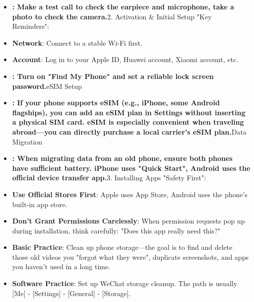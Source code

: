 

\begin{itemize}
  \item \textbf{: Make a test call to check the earpiece and microphone, take a photo to check the camera.}2. Activation \& Initial Setup "Key Reminders":
  \item \textbf{Network}: Connect to a stable Wi-Fi first.
  \item \textbf{Account}: Log in to your Apple ID, Huawei account, Xiaomi account, etc.
\end{itemize}


\begin{itemize}
  \item \textbf{: Turn on "Find My Phone" and set a reliable lock screen password.}eSIM Setup
  \item \textbf{: If your phone supports eSIM (e.g., iPhone, some Android flagships), you can add an eSIM plan in Settings without inserting a physical SIM card. eSIM is especially convenient when traveling abroad—you can directly purchase a local carrier's eSIM plan.}Data Migration
  \item \textbf{: When migrating data from an old phone, ensure both phones have sufficient battery. iPhone uses "Quick Start", Android uses the official device transfer app.}3. Installing Apps "Safety First":
  \item \textbf{Use Official Stores First}: Apple uses App Store, Android uses the phone's built-in app store.
  \item \textbf{Don't Grant Permissions Carelessly}: When permission requests pop up during installation, think carefully: "Does this app really need this?"
\end{itemize}


\begin{itemize}
  \item \textbf{Basic Practice}: Clean up phone storage—the goal is to find and delete those old videos you "forgot what they were", duplicate screenshots, and apps you haven't used in a long time.
  \item \textbf{Software Practice}: Set up WeChat storage cleanup. The path is usually [Me] - [Settings] - [General] - [Storage].
\end{itemize}
